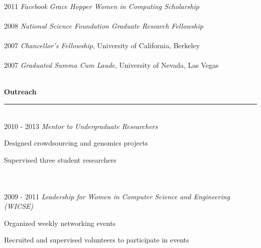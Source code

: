 \documentclass[11pt]{article}
\newcommand{\parwidth}{5.3 in}
\newcommand{\tabwidth}{1.5 in}
\newcommand{\head}[1]{
{\bf #1} \\
\rule{\textwidth}{0.01 in}

\vspace{-0.35 in}

}
\begin{document}
\begin{tabbing}
\hspace{\tabwidth} \= \\

2011 \> \emph{Facebook Grace Hopper Women in Computing Scholarship}\\ \\

2008 \> \emph{National Science Foundation Graduate Research Fellowship} \\ \\

2007 \> \emph{Chancellor's Fellowship}, University of California, Berkeley \\ \\

2007 \> \emph{Graduated Summa Cum Laude}, University of Nevada, Las Vegas \\ \\
\end{tabbing}



\head{Outreach}

\begin{tabbing}
\hspace{\tabwidth} \= \\

2010 - 2013 \> \emph{Mentor to Undergraduate Researchers}\\
\> \parbox[t]{\parwidth}{
\begin{compactitem}
\item Designed crowdsourcing and genomics projects
\item Supervised three student researchers
\end{compactitem}
} \\ \\

2009 - 2011 \> \emph{Leadership for Women in Computer Science and Engineering (WICSE)} \\
\> \parbox[t]{\parwidth}{
\begin{compactitem}
\item Organized weekly networking events
\item Recruited and supervised volunteers to participate in events
\end{compactitem}
} \\

\end{tabbing}
\end{document}
